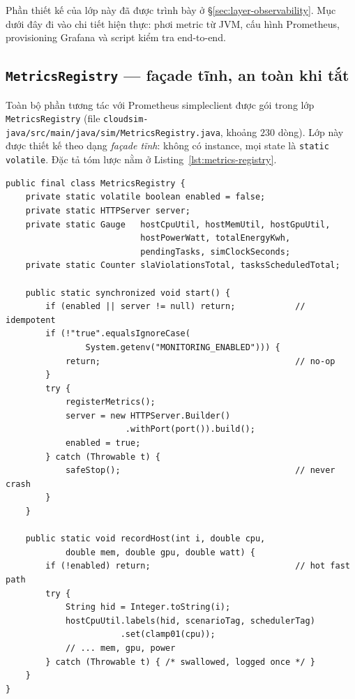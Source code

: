 Phần thiết kế của lớp này đã được trình bày ở
§\ref{sec:layer-observability}. Mục dưới đây đi vào chi tiết hiện
thực: phơi metric từ JVM, cấu hình Prometheus, provisioning Grafana
và script kiểm tra end-to-end.

\subsection{\texttt{MetricsRegistry} --- façade tĩnh, an toàn khi tắt}
Toàn bộ phần tương tác với Prometheus simpleclient được gói trong
lớp \texttt{MetricsRegistry} (file
\texttt{cloudsim-java/src/main/java/sim/MetricsRegistry.java},
khoảng $230$ dòng). Lớp này được thiết kế theo dạng \emph{façade
tĩnh}: không có instance, mọi state là \texttt{static volatile}.
Đặc tả tóm lược nằm ở Listing~\ref{lst:metrics-registry}.

\begin{lstlisting}[style=javastyle, caption={Bộ khung
\texttt{MetricsRegistry}: cờ \texttt{enabled} kiểm soát no-op,
mọi mutator wrap try/catch.},
label={lst:metrics-registry}]
public final class MetricsRegistry {
    private static volatile boolean enabled = false;
    private static HTTPServer server;
    private static Gauge   hostCpuUtil, hostMemUtil, hostGpuUtil,
                           hostPowerWatt, totalEnergyKwh,
                           pendingTasks, simClockSeconds;
    private static Counter slaViolationsTotal, tasksScheduledTotal;

    public static synchronized void start() {
        if (enabled || server != null) return;            // idempotent
        if (!"true".equalsIgnoreCase(
                System.getenv("MONITORING_ENABLED"))) {
            return;                                       // no-op
        }
        try {
            registerMetrics();
            server = new HTTPServer.Builder()
                        .withPort(port()).build();
            enabled = true;
        } catch (Throwable t) {
            safeStop();                                   // never crash
        }
    }

    public static void recordHost(int i, double cpu,
            double mem, double gpu, double watt) {
        if (!enabled) return;                             // hot fast path
        try {
            String hid = Integer.toString(i);
            hostCpuUtil.labels(hid, scenarioTag, schedulerTag)
                       .set(clamp01(cpu));
            // ... mem, gpu, power
        } catch (Throwable t) { /* swallowed, logged once */ }
    }
}
\end{lstlisting}

